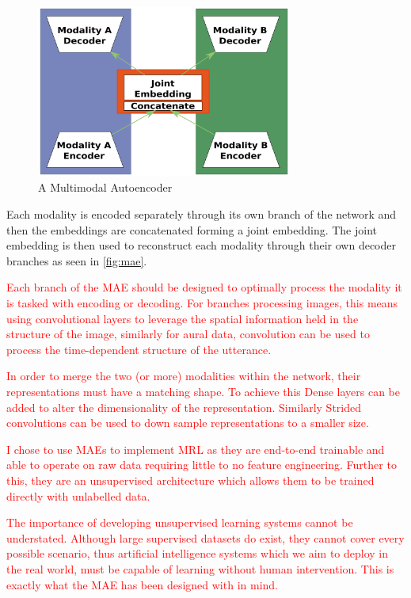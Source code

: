 \begin{figure}
	\centering
	\includegraphics[width=0.75\textwidth]{Figs/intro2dl/MAE.png}
	
	\caption{A Multimodal Autoencoder}
	\label{fig:mae}
\end{figure}

Each modality is encoded separately through its own branch of the network and then the embeddings are concatenated forming a joint embedding. The joint embedding is then used to reconstruct each modality through their own decoder branches as seen in \autoref{fig:mae}.

\textcolor{red}{Each branch of the \ac{MAE} should be designed to optimally process the modality it is tasked with encoding or decoding. For branches processing images, this means using convolutional layers to leverage the spatial information held in the structure of the image, similarly for aural data, convolution can be used to process the time-dependent structure of the utterance.} 

\textcolor{red}{In order to merge the two (or more) modalities within the network, their representations must have a matching shape. To achieve this Dense layers can be added to alter the dimensionality of the representation. Similarly Strided convolutions can be used to down sample representations to a smaller size.}

\textcolor{red}{I chose to use \acp{MAE} to implement \ac{MRL} as they are end-to-end trainable and able to operate on raw data requiring little to no feature engineering. Further to this, they are an unsupervised architecture which allows them to be trained directly with unlabelled data.}

\textcolor{red}{The importance of developing unsupervised learning systems cannot be understated. Although large supervised datasets do exist, they cannot cover every possible scenario, thus artificial intelligence systems which we aim to deploy in the real world, must be capable of learning without human intervention. This is exactly what the \ac{MAE} has been designed with in mind.}

